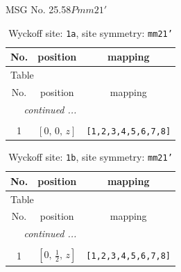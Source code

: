 \documentclass[fleqn,8pt]{jsarticle}
\begin{document}
\setcounter{MaxMatrixCols}{32}

\renewcommand{\tablename}{Table~}
\renewcommand{\figurename}{Figure~}
\begin{center}
\LARGE
MSG No. 25.58\quad$Pmm21'$
\end{center}
\renewcommand{\arraystretch}{1.2}
\begin{longtable}{ccc}
\caption{Wyckoff site: {\tt 1a}, site symmetry: {\tt mm21'}}
 \\
 \hline \hline
No. & position & mapping \\ \hline \endfirsthead

\multicolumn{2}{l}{\tablename\ \thetable{}} \\
 \hline \hline
No. & position & mapping \\ \hline \endhead

 \hline \hline
\multicolumn{2}{r}{\footnotesize\it continued ...} \\ \endfoot

 \hline \hline
\multicolumn{2}{r}{} \\ \endlastfoot

1 & $\left[ 0,\, 0,\, z \right]$ & {\tt [1,2,3,4,5,6,7,8]} \\
\end{longtable}
\renewcommand{\arraystretch}{1.2}
\begin{longtable}{ccc}
\caption{Wyckoff site: {\tt 1b}, site symmetry: {\tt mm21'}}
 \\
 \hline \hline
No. & position & mapping \\ \hline \endfirsthead

\multicolumn{2}{l}{\tablename\ \thetable{}} \\
 \hline \hline
No. & position & mapping \\ \hline \endhead

 \hline \hline
\multicolumn{2}{r}{\footnotesize\it continued ...} \\ \endfoot

 \hline \hline
\multicolumn{2}{r}{} \\ \endlastfoot

1 & $\left[ 0,\, \frac{1}{2},\, z \right]$ & {\tt [1,2,3,4,5,6,7,8]} \\
\end{longtable}
\renewcommand{\arraystretch}{1.2}
\end{document}
